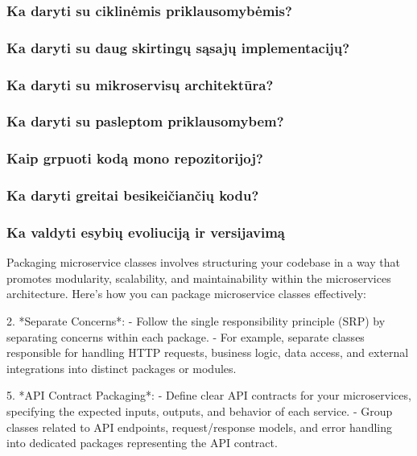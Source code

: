 \subsubsection{Ka daryti su ciklinėmis priklausomybėmis?}

\subsubsection{Ka daryti su daug skirtingų sąsajų implementacijų?}
\subsubsection{Ka daryti su mikroservisų architektūra?}
\subsubsection{Ka daryti su pasleptom priklausomybem?}
\subsubsection{Kaip grpuoti kodą mono repozitorijoj?}
\subsubsection{Ka daryti greitai besikeičiančių kodu?}
\subsubsection{Ka valdyti esybių evoliuciją ir versijavimą}






Packaging microservice classes involves structuring your codebase in a way that promotes modularity, scalability, and maintainability within the microservices architecture. Here's how you can package microservice classes effectively:


2. *Separate Concerns*:
- Follow the single responsibility principle (SRP) by separating concerns within each package.
- For example, separate classes responsible for handling HTTP requests, business logic, data access, and external integrations into distinct packages or modules.


5. *API Contract Packaging*:
- Define clear API contracts for your microservices, specifying the expected inputs, outputs, and behavior of each service.
- Group classes related to API endpoints, request/response models, and error handling into dedicated packages representing the API contract.

